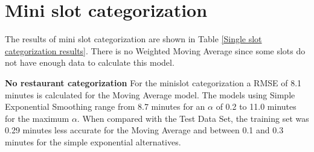 \section{Mini slot categorization}\label{section:Single slot categorization}
The results of mini slot categorization are shown in Table \ref{Single slot categorization results}. There is no Weighted Moving Average since some slots do not have enough data to calculate this model.
\begin{table}[h]
\centering
\caption{Mini slot categorization results}
\label{Single slot categorization results}
\end{table}
\newline\newline\textbf{No restaurant categorization}\newline
For the minislot categorization a RMSE of 8.1 minutes is calculated for the Moving Average model. The models using Simple Exponential Smoothing range from 8.7 minutes for an $\alpha$ of 0.2 to 11.0 minutes for the maximum $\alpha$. When compared with the Test Data Set, the training set was 0.29 minutes less accurate for the Moving Average and between 0.1 and 0.3 minutes for the simple exponential alternatives.\newline
